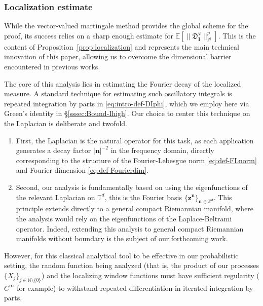 \documentclass[12pt]{amsart}
\theoremstyle{definition}
\theoremstyle{remark}
\newcommand{\bz}{\boldsymbol{z}}
\newcommand{\Z}{\mathbb{Z}}
\newcommand{\T}{\mathbb{T}}
\numberwithin{equation}{section}
\begin{document}
\subsubsection{Localization estimate}\label{sec-loc-es}

While the vector-valued martingale method provides the global scheme for the proof, its success relies on a sharp enough estimate for $\mathbb{E}[\|\mathfrak{D}_{\boldsymbol{I}}^\varphi\|_{\ell^q}^p]$.  This is the content of Proposition~\ref{prop:localization} and represents the main technical innovation of this paper, allowing us to overcome the dimensional barrier encountered in previous works.

The core of this analysis lies in estimating the Fourier decay of the localized measure. A standard technique for estimating such oscillatory integrals is repeated integration by parts in \eqref{eq:intro-def-DIphi}, which we employ here via Green's identity in  \S\ref{sssec:Bound-Ihigh}. Our choice to center this technique on the Laplacian is deliberate and twofold. 
\begin{enumerate}
	\item First, the Laplacian is the natural operator for this task, as each application generates a decay factor $|\boldsymbol{n}|^{-2}$ in the frequency domain, directly corresponding to the structure of the Fourier-Lebesgue norm \eqref{eq:def-FLnorm} and Fourier dimension \eqref{eq:def-Fourierdim}.
	\item Second, our analysis is fundamentally based on using the eigenfunctions of the relevant Laplacian on $\T^d$, this is the Fourier basis $\{\bz^{\boldsymbol{n}}\}_{\boldsymbol{n}\in \Z^d}$. This principle extends directly to a general compact Riemannian manifold, where the analysis would rely on the eigenfunctions of the Laplace-Beltrami operator. Indeed, extending this analysis to general compact Riemannian manifolds without boundary is the subject of our forthcoming work.
\end{enumerate}

However, for this classical analytical tool to be effective in our probabilistic setting, the random function being analyzed (that is, the product of our processes $\{X_j\}_{j\in \mathbb{N}\setminus \{0\}}$) and the localizing window functions must have sufficient regularity ($C^\infty$ for example) to withstand repeated differentiation in iterated integration by parts.
\end{document}
